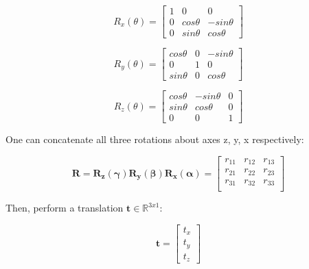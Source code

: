 \documentclass[a4paper]{report}
\numberwithin{figure}{section}
\newcommand{\R}{\mathbb{R}}
\begin{document}
\begin{equation}
  R_x(\theta) = 
  \begin{bmatrix}
    1 & 0 & 0\\
    0 & cos\theta & -sin\theta\\
    0 & sin\theta & cos\theta
  \end{bmatrix}
\end{equation} \label{eq:rot_matrx_x}

\begin{equation}
  R_y(\theta) = 
  \begin{bmatrix}
    cos\theta & 0 & -sin\theta\\
    0 & 1 & 0\\
    sin\theta & 0 & cos\theta
  \end{bmatrix}
\end{equation} \label{eq:rot_matrx_y}

\begin{equation}
  R_z(\theta) = 
  \begin{bmatrix}
    cos\theta & -sin\theta & 0\\
    sin\theta & cos\theta & 0\\
    0 & 0 & 1
  \end{bmatrix}
\end{equation} \label{eq:rot_matrx_z}

One can concatenate all three rotations about axes z, y, x respectively:

\begin{equation}
  \mathbf{R} = \mathbf{R_z(\gamma)}\mathbf{R_y(\beta)}\mathbf{R_x(\alpha)}
  =
  \begin{bmatrix}
    r_{11} & r_{12} & r_{13}\\
    r_{21} & r_{22} & r_{23}\\
    r_{31} & r_{32} & r_{33}\\
  \end{bmatrix}
\end{equation} \label{eq:rot_matrix_derivation}

Then, perform a translation $\mathbf{t} \in \R^{3x1}$:

\begin{equation}
  \mathbf{t} = 
  \begin{bmatrix}
    t_x \\ t_y \\ t_z
  \end{bmatrix}
\end{equation} \label{eq:translation}
\end{document}
